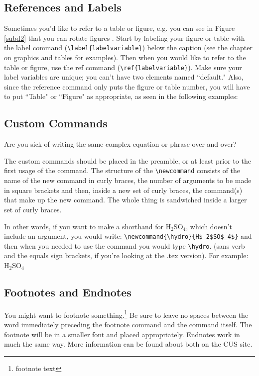 \documentclass[12pt,twoside]{reedthesis}
\begin{document}
   \subsection{References and Labels}
   Sometimes you'd like to refer to a table or figure, e.g. you can see in Figure \ref{subd2} that you can rotate figures . Start by labeling your figure or table with the label command (\verb=\label{labelvariable}=) below the caption (see the chapter on graphics and tables for examples). Then when you would like to refer to the table or figure, use the ref command (\verb=\ref{labelvariable}=). Make sure your label variables are unique; you can't have two elements named ``default." Also, since the reference command only puts the figure or table number, you will have to put  ``Table" or ``Figure" as appropriate, as seen in the following examples:
   
   
   \subsection{Custom Commands}\label{commands}
   Are you sick of writing the same complex equation or phrase over and over? 
   
   The custom commands should be placed in the preamble, or at least prior to the first usage of the command. The structure of the \verb=\newcommand= consists of the name of the new command in curly braces, the number of arguments to be made in square brackets and then, inside a new set of curly braces, the command(s) that make up the new command. The whole thing is sandwiched inside a larger set of curly braces. 
   
   \newcommand{\hydro}{H$_2$SO$_4$}
   
   In other words, if you want to make a shorthand for H$_2$SO$_4$, which doesn't include an argument, you would write: \verb=\newcommand{\hydro}{H$_2$SO$_4$}= and then when you needed  to use the command you would type \verb=\hydro=. (sans verb and the equals sign brackets, if you're looking at the .tex version). For example: \hydro
   
   \subsection{Footnotes and Endnotes}
   You might want to footnote something.\footnote{footnote text} Be sure to leave no spaces between the word immediately preceding the footnote command and the command itself. The footnote will be in a smaller font and placed appropriately. Endnotes work in much the same way. More information can be found about both on the CUS site.
   
\end{document}
